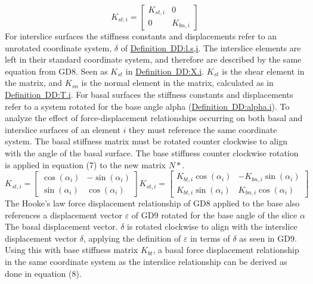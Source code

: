 \documentclass[12pt]{article}
\begin{document}
\begin{dmath}
{K_{st,i}}=\begin{bmatrix}
{K_{st,i}} & 0\\
0 & {K_{bn,i}}
\end{bmatrix}
\end{dmath}
For interslice surfaces the stiffness constants and displacements refer to an unrotated coordinate system, $δ$ of \hyperref[DD:l.s,i]{Definition~DD:l.s,i}. The interslice elements are left in their standard coordinate system, and therefore are described by the same equation from GD8. Seen as ${K_{st}}$ in \hyperref[DD:X.i]{Definition~DD:X.i}. ${K_{st}}$ is the shear element in the matrix, and ${K_{sn}}$ is the normal element in the matrix, calculated as in \hyperref[DD:T.i]{Definition~DD:T.i}.
For basal surfaces the stiffness constants and displacements refer to a system rotated for the base angle alpha (\hyperref[DD:alpha.i]{Definition~DD:alpha.i}). To analyze the effect of force-displacement relationships occurring on both basal and interslice surfaces of an element $i$ they must reference the same coordinate system. The basal stiffness matrix must be rotated counter clockwise to align with the angle of the basal surface. The base stiffness counter clockwise rotation is applied in equation (7) to the new matrix $N*$.
\begin{dmath}
{K_{st,i}}=\begin{bmatrix}
\cos\left(α_{i}\right) & -\sin\left(α_{i}\right)\\
\sin\left(α_{i}\right) & \cos\left(α_{i}\right)
\end{bmatrix} {K_{st,i}}=\begin{bmatrix}
{K_{bt,i}} \cos\left(α_{i}\right) & -{K_{bn,i}} \sin\left(α_{i}\right)\\
{K_{bt,i}} \sin\left(α_{i}\right) & {K_{bn,i}} \cos\left(α_{i}\right)
\end{bmatrix}
\end{dmath}
The Hooke's law force displacement relationship of GD8 applied to the base also references a displacement vector $ε$ of GD9 rotated for the base angle of the slice $α$ The basal displacement vector. $δ$ is rotated clockwise to align with the interslice displacement vector $δ$, applying the definition of $ε$ in terms of $δ$ as seen in GD9. Using this with base stiffness matrix ${K_{bt}}$, a basal force displacement relationship in the same coordinate system as the interslice relationship can be derived as done in equation (8).
\end{document}
